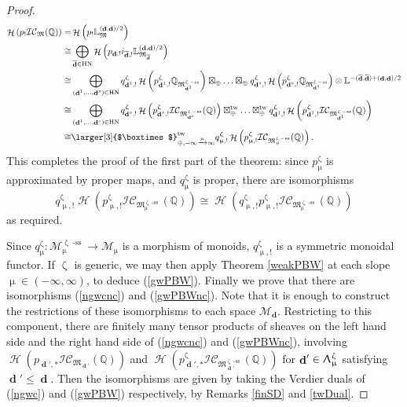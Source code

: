 \documentclass[a4paper,10pt]{amsart}
\renewcommand{\zeta}{\upzeta}
\renewcommand{\Lambda}{\Uplambda}
\renewcommand{\mu}{\upmu}
\newcommand{\Boxtimes}{\mbox{\larger[3]{$\boxtimes$}}}
\DeclareMathOperator{\HN}{HN}
\newcommand{\LL}{\mathbb{L}}
\newcommand{\QQ}{\mathbb{Q}}
\newcommand{\Mst}{\mathfrak{M}}
\newcommand{\Msp}{\mathcal{M}}
\newcommand{\ICS}{\mathcal{IC}}
\DeclareMathOperator{\sst}{-ss}
\DeclareMathOperator{\tw}{tw}
\DeclareMathOperator{\dd}{\mathbf{d}}
\DeclareMathOperator{\Ho}{\mathcal{H}}
\begin{document}
\begin{proof}
\begin{align}
\label{int1}
\Ho\left(p_!\ICS_{\Mst}(\QQ)\right)=&\Ho\left(p_!\LL^{(\dd,\dd)/2}_{\Mst}\right)\\
\nonumber\cong&\bigoplus_{\overline{\dd}\in\HN}\Ho\left(p_{\dd,!}i_{\overline{\dd},!}\LL^{(\dd,\dd)/2}_{\Mst_{\overline{\dd}}}\right)\\
\nonumber\cong&\bigoplus_{(\dd^1,\ldots,\dd^s)\in\HN}q^{\zeta}_{\dd^1,!}\Ho\left(p^{\zeta}_{\dd^1,!}\QQ_{\Mst_{\dd^1}^{\zeta\sst}}\right)\boxtimes_{\oplus}\ldots\boxtimes_{\oplus} q^{\zeta}_{\dd^s,!}\Ho\left(p^{\zeta}_{\dd^s,!}\QQ_{\Mst_{\dd^s}^{\zeta\sst}}\right)\otimes\LL^{-(\overline{\dd},\overline{\dd})+(\dd,\dd)/2}\\
\nonumber\cong&\bigoplus_{(\dd^1,\ldots,\dd^s)\in\HN}q^{\zeta}_{\dd^s,!}\Ho\left(p^{\zeta}_{\dd^s,!}\ICS_{\Mst_{\dd^s}^{\zeta\sst}}(\QQ)\right)\boxtimes^{\tw}_{\oplus}\ldots\boxtimes^{\tw}_{\oplus} q^{\zeta}_{\dd^1,!}\Ho\left(p^{\zeta}_{\dd^1,!}\ICS_{\Mst_{\dd^1}^{\zeta\sst}}(\QQ)\right)\\
\nonumber \cong&\Boxtimes_{\oplus, -\infty\xrightarrow{\mu} \infty}^{\tw} q_{\mu,!}^{\zeta}\Ho\left(p_{\mu,!}^{\zeta}\ICS_{\Mst_{\mu}^{\zeta\sst}}(\mathbb{Q})\right).
\end{align}
This completes the proof of the first part of the theorem: since $p^{\zeta}_{\mu}$ is approximated by proper maps, and $q^{\zeta}_{\mu}$ is proper, there are isomorphisms
\[
q^{\zeta}_{\mu,!} \Ho(p^{\zeta}_{\mu,!}\ICS_{\Mst_{\mu}^{\zeta\sst}}(\mathbb{Q}))\cong \Ho(q^{\zeta}_{\mu,!}p^{\zeta}_{\mu,!}\ICS_{\Mst_{\mu}^{\zeta\sst}}(\mathbb{Q}))
\]
as required.

Since $q^{\zeta}_{\mu}\colon \Msp^{\zeta\sst}_{\mu}\rightarrow\Msp_{\mu}$ is a morphism of monoids, $q^{\zeta}_{\mu,!}$ is a symmetric monoidal functor.  If $\zeta$ is generic, we may then apply Theorem \ref{weakPBW} at each slope $\mu\in(-\infty,\infty)$, to deduce (\ref{gwPBW}).  Finally we prove that there are isomorphisms (\ref{ngwcnc}) and (\ref{gwPBWnc}).  Note that it is enough to construct the restrictions of these isomorphisms to each space $\Msp_{\dd}$.  Restricting to this component, there are finitely many tensor products of sheaves on the left hand side and the right hand side of (\ref{ngwcnc}) and (\ref{gwPBWnc}), involving $\Ho(p_{\dd',*}\ICS_{\Mst_{\dd'}}(\QQ))$ and $\Ho(p^{\zeta}_{\dd',*}\ICS_{\Mst_{\dd'}^{\zeta\sst}}(\mathbb{Q}))$ for $\dd'\in\Lambda_{\mu}^\zeta$ satisfying $\dd'\leq \dd$.  Then the isomorphisms are given by taking the Verdier duals of (\ref{ngwc}) and (\ref{gwPBW}) respectively, by Remarks \ref{finSD} and \ref{twDual}.
\end{proof}
\end{document}
